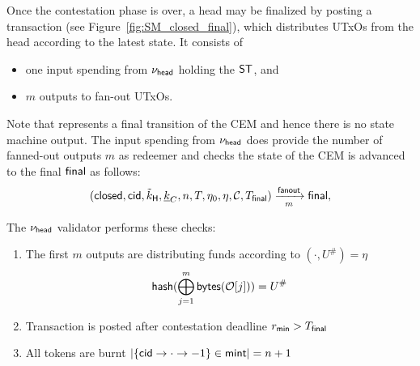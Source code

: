 \noindent Once the contestation phase is over, a head may be finalized by posting a
\mtxFanout{} transaction (see Figure~\ref{fig:SM_closed_final}), which
distributes UTxOs from the head according to the latest state. It consists of
\begin{itemize}
  \item one input spending from $\nu_\mathsf{head}$ holding the $\mathsf{ST}$, and
  \item $m$ outputs to fan-out UTxOs.
\end{itemize}
Note that \mtxFanout{} represents a final transition of the CEM and hence there
is no state machine output. The input spending from $\nu_\mathsf{head}$ does provide the
number of fanned-out outputs $m$ as redeemer and checks the state of the CEM is
advanced to the final $\mathsf{final}$ as follows:
\[
  (\mathsf{closed},\mathsf{cid},\tilde{k}_{\mathsf{H}},\underline{k}_C,n,T,\eta_0,\eta,\mathcal{C},T_{\mathsf{final}}) \xrightarrow[m]{\mathsf{fanout}} \mathsf{final},
\]

\noindent The $\nu_\mathsf{head}$ validator performs these checks:
\begin{enumerate}
  \item The first $m$ outputs are distributing funds according to
        $(\cdot, U^{\#}) = \eta$
        \[
        \mathsf{hash}(\bigoplus_{j=1}^{m} \mathsf{bytes}(\mathcal{O}[j])) = U^{\#}
        \]
  \item Transaction is posted after contestation deadline $r_{\mathsf{min}} > T_{\mathsf{final}}$
  \item All tokens are burnt
        $|\{\mathsf{cid} \rightarrow \cdot \rightarrow -1\} \in \mathsf{mint}| = n + 1$
\end{enumerate}

